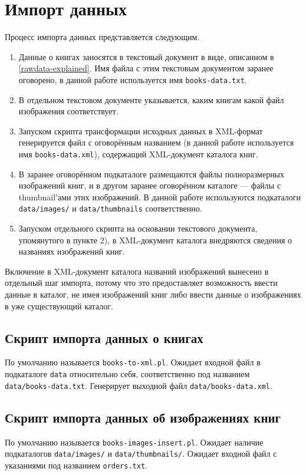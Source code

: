 \documentclass[a4paper,14pt,oneside]{extreport}
\begin{document}
\section{Импорт данных}
Процесс импорта данных представляется следующим.
\begin{enumerate}
\item Данные о книгах заносятся в текстовый документ в виде, описанном в \ref{rawdata-explained}. Имя файла с этим текстовым документом заранее оговорено, в данной работе используется имя \verb'books-data.txt'.
\item В отдельном текстовом документе указывается, каким книгам какой файл изображения соответствует.
\item Запуском скрипта трансформации исходных данных в XML-формат генерируется файл с оговорённым названием (в данной работе используется имя \verb'books-data.xml'), содержащий XML-документ каталога книг.
\item В заранее оговорённом подкаталоге размещаются файлы полноразмерных изображений книг, и в другом заранее оговорённом каталоге --- файлы с thumbnail'ами этих изображений. В данной работе используются подкаталоги \verb'data/images/' и \verb'data/thumbnails' соответственно.
\item Запуском отдельного скрипта на основании текстового документа, упомянутого в пункте 2), в XML-документ каталога внедряются сведения о названиях изображений книг.
\end{enumerate}

Включение в XML-документ каталога названий изображений вынесено в отдельный шаг импорта, потому что это предоставляет возможность ввести данные в каталог, не имея изображений книг либо ввести данные о изображениях в уже существующий каталог.

\subsection{Скрипт импорта данных о книгах}
По умолчанию называется \verb'books-to-xml.pl'. Ожидает входной файл в подкаталоге \verb'data' относительно себя, соответственно под названием \\ \verb'data/books-data.txt'. Генерирует выходной файл \verb'data/books-data.xml'.

\subsection{Скрипт импорта данных об изображениях книг}
По умолчанию называется \verb'books-images-insert.pl'. Ожидает наличие подкаталогов \verb'data/images/' и \verb'data/thumbnails/'. Ожидает входной файл с указаниями под названием \verb'orders.txt'. 
\end{document}
